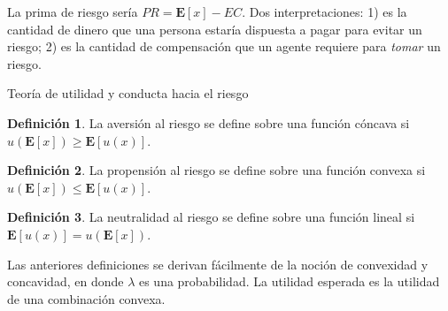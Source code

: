 \documentclass[12pt]{scrartcl}
\theoremstyle{definition}
\newtheorem{defi}{Definición}[section]
\begin{document}
La prima de riesgo sería $PR=\mathbf{E}[x]-EC$. Dos interpretaciones: 1) es la cantidad de dinero que una persona estaría dispuesta a pagar para evitar un riesgo; 2) es la cantidad de compensación que un agente requiere para \textit{tomar} un riesgo.

\begin{mybox}{Teoría de utilidad y conducta hacia el riesgo}
	\begin{defi}
		La aversión al riesgo se define sobre una función cóncava si $u(\mathbf{E}[x]) \geq \mathbf{E}[u(x)]$.
	\end{defi}

	\begin{defi}
		La propensión al riesgo se define sobre una función convexa si $u(\mathbf{E}[x]) \leq \mathbf{E}[u(x)]$.
	\end{defi}

	\begin{defi}
		La neutralidad al riesgo se define sobre una función lineal si $\mathbf{E}[u(x)] = u(\mathbf{E}[x]) $.
	\end{defi}
\end{mybox}


Las anteriores definiciones se derivan fácilmente de la noción de convexidad y concavidad, en donde $\lambda$ es una probabilidad. La utilidad esperada es la utilidad de una combinación convexa.
\end{document}

